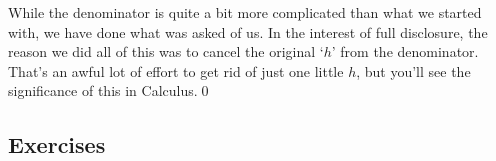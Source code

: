 \begin{ex}
While the denominator is quite a bit more complicated than what we started with, we have done what was asked of us.  In the interest of full disclosure, the reason we did all of this was to cancel the original `$h$' from the denominator. That's an awful lot of effort to get rid of just one little $h$, but you'll see the significance of this in Calculus.\qed

\end{ex}

\clearpage

\subsection{Exercises}



\closegraphsfile